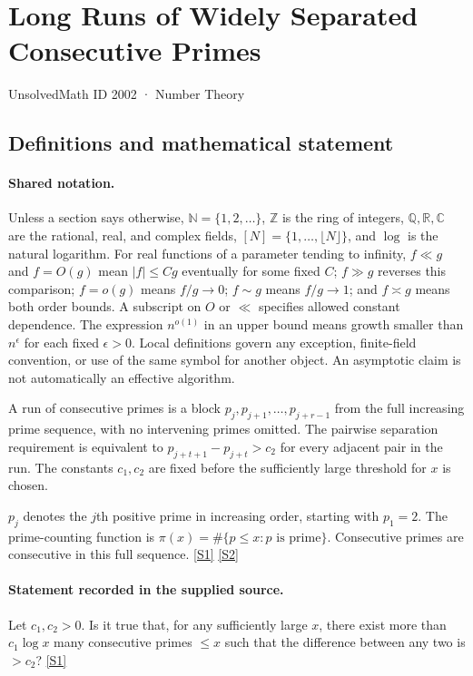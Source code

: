 \documentclass[11pt,a4paper]{article}
\newcommand{\N}{\mathbb{N}}
\newcommand{\Z}{\mathbb{Z}}
\newcommand{\Q}{\mathbb{Q}}
\newcommand{\R}{\mathbb{R}}
\newcommand{\C}{\mathbb{C}}
\newcommand{\sref}[2]{\hyperlink{source:#1:#2}{[S#2]}}
\begin{document}

\setcounter{section}{2001}

\section{Long Runs of Widely Separated Consecutive Primes}\label{2002}

{\small\sffamily UnsolvedMath ID 2002 · Number Theory}

\subsection{Definitions and mathematical statement}

\paragraph{Shared notation.}Unless a section says otherwise, $\N=\{1,2,\ldots\}$,
$\Z$ is the ring of integers, $\Q,\R,\C$ are the rational, real, and complex
fields, $[N]=\{1,\ldots,\lfloor N\rfloor\}$, and $\log$ is the natural
logarithm. For real functions of a parameter tending to infinity,
$f\ll g$ and $f=O(g)$ mean $|f|\leq Cg$ eventually for some fixed $C$;
$f\gg g$ reverses this comparison; $f=o(g)$ means $f/g\to0$;
$f\sim g$ means $f/g\to1$; and $f\asymp g$ means both order bounds.
A subscript on $O$ or $\ll$ specifies allowed constant dependence.
The expression $n^{o(1)}$ in an upper bound means growth smaller than
$n^\epsilon$ for each fixed $\epsilon>0$. Local definitions govern any
exception, finite-field convention, or use of the same symbol for another
object. An asymptotic claim is not automatically an effective algorithm.



A run of consecutive primes is a block $p_j,p_{j+1},\ldots,p_{j+r-1}$ from the full increasing prime sequence, with no intervening primes omitted. The pairwise separation requirement is equivalent to $p_{j+t+1}-p_{j+t}>c_2$ for every adjacent pair in the run. The constants $c_1,c_2$ are fixed before the sufficiently large threshold for $x$ is chosen.

$p_j$ denotes the $j$th positive prime in increasing order, starting with $p_1=2$. The prime-counting function is $\pi(x)=\#\{p\leq x:p\text{ is prime}\}$. Consecutive primes are consecutive in this full sequence. \sref{2002}{1} \sref{2002}{2}

\paragraph{Statement recorded in the supplied source.}
Let $c_1,c_2>0$. Is it true that, for any sufficiently large $x$, there exist more than $c_1\log x$ many consecutive primes $\leq x$ such that the difference between any two is $>c_2$? \sref{2002}{1}
\end{document}
